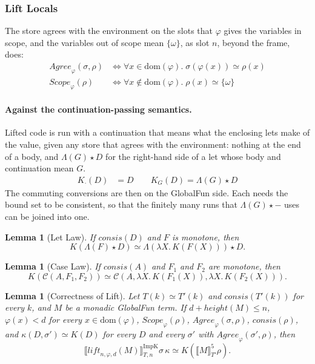 \documentclass[10pt]{article}
\theoremstyle{acmplain}
\newtheorem{lemma}[theorem]{Lemma}
\newcommand{\SEM}[1]{\llbracket #1 \rrbracket}
\newcommand{\pass}[1]{\mathit{#1}}
\newcommand{\app}{\star}
\newcommand{\consis}{\mathit{consis}}
\begin{document}
\subsubsection{Lift Locals}

The store agrees with the environment on the slots that $\varphi$ gives
the variables in scope, and the variables out of scope mean
$\{\omega\}$, as slot $n$, beyond the frame, does:
\begin{align*}
  \mathit{Agree}_{\varphi}(\sigma, \rho) &\iff
    \forall x \in \mathrm{dom}(\varphi).\; \sigma(\varphi(x)) \simeq \rho(x) \\
  \mathit{Scope}_{\varphi}(\rho) &\iff
    \forall x \notin \mathrm{dom}(\varphi).\; \rho(x) \simeq \{\omega\}
\end{align*}

\paragraph{Against the continuation-passing semantics.}
Lifted code is run with a continuation that means what the enclosing
lets make of the value, given any store that agrees with the
environment: nothing at the end of a body, and $\Lambda(G) \app D$ for
the right-hand side of a let whose body and continuation mean $G$.
\begin{align*}
  K_{\cdot}(D) &= D \qquad K_G(D) = \Lambda(G) \app D
\end{align*}
The commuting conversions are then on the GlobalFun side. Each needs the
bound set to be consistent, so that the finitely many runs that
$\Lambda(G) \app -$ uses can be joined into one.

\begin{lemma}[Let Law]\label{lem:let-law}
If $\consis(D)$ and $F$ is monotone, then
\[
  K(\Lambda(F) \app D) \simeq \Lambda(\lambda X.\, K(F(X))) \app D .
\]
\end{lemma}

\begin{lemma}[Case Law]\label{lem:case-law}
If $\consis(A)$ and $F_1$ and $F_2$ are monotone, then
\[
  K(\mathcal{C}(A, F_1, F_2)) \simeq \mathcal{C}(A, \lambda X.\, K(F_1(X)), \lambda X.\, K(F_2(X))) .
\]
\end{lemma}

\begin{lemma}[Correctness of Lift]\label{lem:lift-sem}
Let $T(k) \simeq T'(k)$ and $\consis(T'(k))$ for every $k$, and $M$ be a
monadic GlobalFun term. If $d + \mathit{height}(M) \leq n$, $\varphi(x) < d$
for every $x \in \mathrm{dom}(\varphi)$, $\mathit{Scope}_{\varphi}(\rho)$,
$\mathit{Agree}_{\varphi}(\sigma, \rho)$, $\consis(\rho)$, and
$\kappa(D, \sigma') \simeq K(D)$ for every $D$ and every $\sigma'$ with
$\mathit{Agree}_{\varphi}(\sigma', \rho)$, then
\[
  \SEM{\pass{lift}_{n,\varphi,d}(M)}^{\mathrm{ImpK}}_{T,n}\sigma\,\kappa
  \simeq K(\SEM{M}^{\mathrm{5}}_{T'}\rho) .
\]
\end{lemma}
\end{document}
